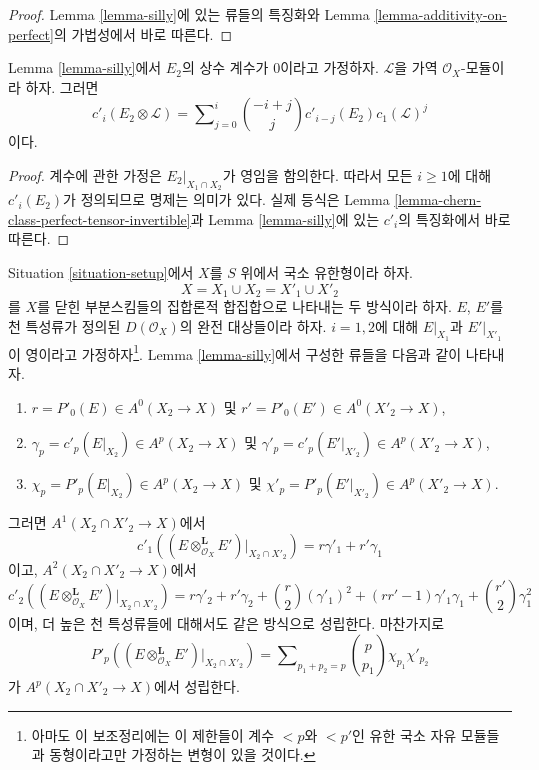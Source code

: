 \begin{proof}
Lemma \ref{lemma-silly}에 있는 류들의 특징화와 Lemma
\ref{lemma-additivity-on-perfect}의 가법성에서 바로 따른다.
\end{proof}

\begin{lemma}
\label{lemma-silly-tensor-invertible}
Lemma \ref{lemma-silly}에서 $E_2$의 상수 계수가 $0$이라고 가정하자.
$\mathcal{L}$을 가역 $\mathcal{O}_X$-모듈이라 하자. 그러면
$$
c'_i(E_2 \otimes \mathcal{L}) =
\sum\nolimits_{j = 0}^i
\binom{- i + j}{j} c'_{i - j}(E_2) c_1(\mathcal{L})^j
$$
이다.
\end{lemma}

\begin{proof}
계수에 관한 가정은 $E_2|_{X_1 \cap X_2}$가 영임을 함의한다. 따라서
모든 $i \geq 1$에 대해 $c'_i(E_2)$가 정의되므로 명제는 의미가 있다.
실제 등식은 Lemma \ref{lemma-chern-class-perfect-tensor-invertible}과
Lemma \ref{lemma-silly}에 있는 $c'_i$의 특징화에서 바로 따른다.
\end{proof}

\begin{lemma}
\label{lemma-silly-tensor-product}
Situation \ref{situation-setup}에서 $X$를 $S$ 위에서 국소 유한형이라 하자.
$$
X = X_1 \cup X_2 = X'_1 \cup X'_2
$$
를 $X$를 닫힌 부분스킴들의 집합론적 합집합으로 나타내는 두 방식이라
하자. $E$, $E'$를 천 특성류가 정의된 $D(\mathcal{O}_X)$의 완전
대상들이라 하자. $i = 1, 2$에 대해 $E|_{X_1}$과 $E'|_{X'_1}$이
영이라고 가정하자\footnote{아마도 이 보조정리에는 이 제한들이 계수
$< p$와 $< p'$인 유한 국소 자유 모듈들과 동형이라고만 가정하는
변형이 있을 것이다.}. Lemma \ref{lemma-silly}에서 구성한 류들을 다음과
같이 나타내자.
\begin{enumerate}
\item $r = P'_0(E) \in A^0(X_2 \to X)$ 및
$r' = P'_0(E') \in A^0(X'_2 \to X)$,
\item $\gamma_p = c'_p(E|_{X_2}) \in A^p(X_2 \to X)$ 및
$\gamma'_p = c'_p(E'|_{X'_2}) \in A^p(X'_2 \to X)$,
\item $\chi_p = P'_p(E|_{X_2}) \in A^p(X_2 \to X)$ 및
$\chi'_p = P'_p(E'|_{X'_2}) \in A^p(X'_2 \to X)$.
\end{enumerate}
그러면 $A^1(X_2 \cap X'_2 \to X)$에서
$$
c'_1((E \otimes_{\mathcal{O}_X}^\mathbf{L} E')|_{X_2 \cap X'_2}) =
r \gamma'_1 + r' \gamma_1
$$
이고, $A^2(X_2 \cap X'_2 \to X)$에서
$$
c'_2((E \otimes_{\mathcal{O}_X}^\mathbf{L} E')|_{X_2 \cap X'_2}) =
r \gamma'_2 + r' \gamma_2 + {r \choose 2} (\gamma'_1)^2 +
(rr' - 1) \gamma'_1\gamma_1 + {r' \choose 2} \gamma_1^2
$$
이며, 더 높은 천 특성류들에 대해서도 같은 방식으로 성립한다. 마찬가지로
$$
P'_p((E \otimes_{\mathcal{O}_X}^\mathbf{L} E')|_{X_2 \cap X'_2}) =
\sum\nolimits_{p_1 + p_2 = p}
{p \choose p_1} \chi_{p_1} \chi'_{p_2}
$$
가 $A^p(X_2 \cap X'_2 \to X)$에서 성립한다.
\end{lemma}

